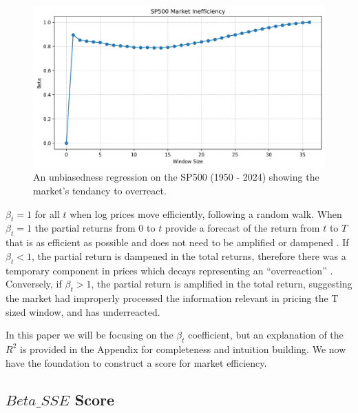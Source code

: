 \begin{figure}[h!]
    \centering
    \includegraphics[width=1\textwidth]{../figs/SP500 Market Inefficiency.png}
    \caption{An unbiasedness regression on the SP500 (1950 - 2024) showing the market's tendancy to overreact.}
    \label{fig:sp_500_unbiasedness}
\end{figure}

$\beta_t = 1$ for all $t$ when log prices move efficiently, following a random walk. When 
$\beta_t = 1$ the partial returns from $0$ to $t$ provide a forecast of the return from $t$ to $T$ that is as efficient as possible 
and does not need to be amplified or dampened \citep{mincer_zarnowitz_1969}. 
 If $\beta_t < 1$, the partial return is dampened in the total returns, therefore there was a temporary component in prices which decays representing an “overreaction” \citep{barclay_hendershott_2003}.
Conversely, if $\beta_t > 1$, the partial return is amplified in the total return, suggesting the market had improperly processed the information relevant in pricing the T sized window, and has underreacted.

In this paper we will be focusing on the $\beta_t$ coefficient, but an explanation of the $R^2$ is provided in the Appendix for completeness and intuition building. 
We now have the foundation to construct a score for market efficiency.

\subsection{$Beta\_SSE$ Score}


